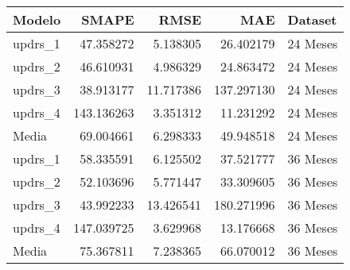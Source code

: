 \begin{tabular}{lrrrl}
\toprule
Modelo & SMAPE & RMSE & MAE & Dataset \\
\midrule
updrs_1 & 47.358272 & 5.138305 & 26.402179 & 24 Meses \\
updrs_2 & 46.610931 & 4.986329 & 24.863472 & 24 Meses \\
updrs_3 & 38.913177 & 11.717386 & 137.297130 & 24 Meses \\
updrs_4 & 143.136263 & 3.351312 & 11.231292 & 24 Meses \\
Media & 69.004661 & 6.298333 & 49.948518 & 24 Meses \\
updrs_1 & 58.335591 & 6.125502 & 37.521777 & 36 Meses \\
updrs_2 & 52.103696 & 5.771447 & 33.309605 & 36 Meses \\
updrs_3 & 43.992233 & 13.426541 & 180.271996 & 36 Meses \\
updrs_4 & 147.039725 & 3.629968 & 13.176668 & 36 Meses \\
Media & 75.367811 & 7.238365 & 66.070012 & 36 Meses \\
\bottomrule
\end{tabular}
